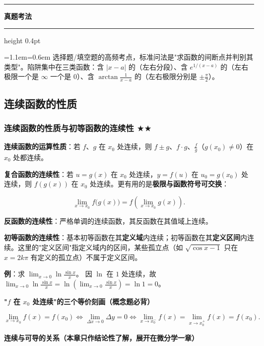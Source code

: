 \documentclass[11pt,openany,UTF8]{ctexbook}
\newcommand{\callouthead}[2]{%
  \par\addvspace{7pt}\noindent
  {\color{#1}\rule[-0.15em]{3pt}{1.05em}}\hspace{0.5em}%
  {\bfseries\color{#1}#2}\par\nobreak\vspace{-0.35em}%
  {\color{rulesep}\hrule height 0.4pt}\nobreak\vspace{0.45em}%
  \begingroup\small\setlength{\parindent}{0pt}%
  \leftskip=1.1em\rightskip=0.6em\noindent\ignorespaces}
\newcommand{\calloutend}{\par\endgroup\addvspace{7pt}}
\newenvironment{callexam}[1]{\callouthead{exambar}{#1}}{\calloutend}
\begin{document}
\begin{callexam}{真题考法}
选择题/填空题的高频考点，标准问法是"求函数的间断点并判别其类型"。陷阱集中在三类函数：含 $\vert x-a\vert$ 的（左右分段）、含 $e^{1/(x-a)}$ 的（左右极限一个是 $\infty$ 一个是 $0$）、含 $\arctan\frac{1}{x-a}$ 的（左右极限分别是 $\pm\frac{\pi}{2}$）。

\end{callexam}

\subsection{连续函数的性质}

\subsubsection{连续函数的性质与初等函数的连续性 $\bigstar$$\bigstar$}

\textbf{连续函数的运算性质}：若 $f$、$g$ 在 $x_0$ 处连续，则 $f\pm g$、$f\cdot g$、$\frac fg$（$g(x_0)\ne 0$）在 $x_0$ 处都连续。

\textbf{复合函数的连续性}：若 $u=g(x)$ 在 $x_0$ 处连续，$y=f(u)$ 在 $u_0=g(x_0)$ 处连续，则 $f(g(x))$ 在 $x_0$ 处连续。更有用的是\textbf{极限与函数符号可交换}：

\[\lim_{x\to x_0}f\bigl(g(x)\bigr)=f\!\left(\lim_{x\to x_0}g(x)\right).\]

\textbf{反函数的连续性}：严格单调的连续函数，其反函数在其值域上连续。

\textbf{初等函数的连续性}：基本初等函数在其\textbf{定义域}内连续；初等函数在其\textbf{定义区间}内连续。这里的"定义区间"指定义域内的区间，某些孤立点（如 $\sqrt{\cos x-1}$ 只在 $x=2k\pi$ 有定义的孤立点）不属于定义区间。

\textbf{例}：求 $\lim_{x\to 0}\ln\frac{\sin x}{x}$。 因 $\ln$ 在 $1$ 处连续，故 $\lim_{x\to 0}\ln\frac{\sin x}{x}=\ln\left(\lim_{x\to 0}\frac{\sin x}{x}\right)=\ln 1=0$。

\textbf{"$f$ 在 $x_0$ 处连续"的三个等价刻画（概念题必背）}

\[\lim_{x\to x_0}f(x)=f(x_0) \iff \lim_{\Delta x\to 0}\Delta y=0 \iff \lim_{x\to x_0^-}f(x)=\lim_{x\to x_0^+}f(x)=f(x_0).\]

\textbf{连续与可导的关系（本章只作结论性了解，展开在微分学一章）}
\end{document}
